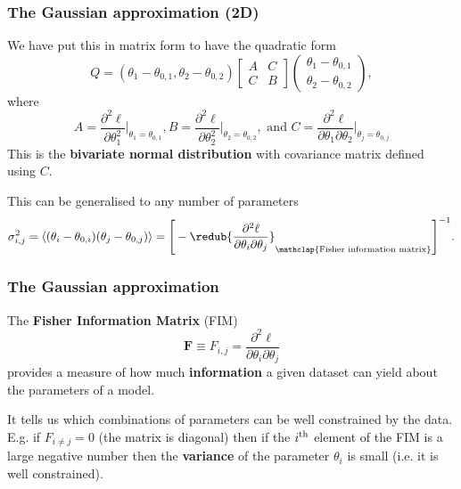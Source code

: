 \begin{frame}

\frametitle{The Gaussian approximation (2D)}
\label{thegaussianapproximation2d}

We have put this in matrix form to have the quadratic form
\[
Q = (\theta_1-\theta_{0,1}, \theta_2-\theta_{0,2})\left[ 
\begin{array}{cc}
A & C \\
C & B
\end{array}\right]\left( \begin{array}{c}
\theta_1-\theta_{0,1} \\
\theta_2-\theta_{0,2}
\end{array}\right),
\]
where
\[
A = \frac{\partial^2 \ell}{\partial \theta^2_1}\Big|_{\theta_1=\theta_{0,1}}, 
B = \frac{\partial^2 \ell}{\partial \theta^2_2}\Big|_{\theta_2=\theta_{0,2}}, \text{ and }
C = \frac{\partial^2 \ell}{\partial \theta_1 \partial \theta_2}\Big|_{\theta_j=\theta_{0,j}}
\]
This is the \textbf{bivariate normal distribution} with covariance matrix defined using $C$.

This can be generalised to any number of parameters
\[
\sigma_{i,j}^2 = \langle(\theta_i-\theta_{0,i})(\theta_j-\theta_{0,j})\rangle = \Bigg[ -\redub{\frac{\partial^2 \ell}{\partial \theta_i \partial \theta_j}}_{\mathclap{\text{Fisher information matrix}}} \Bigg]^{-1}.
\]

\end{frame}

\begin{frame}

\frametitle{The Gaussian approximation}
\label{thegaussianapproximation}

The \textbf{Fisher Information Matrix} (FIM)
\[
\mathbf{F} \equiv F_{i,j} = \frac{\partial^2 \ell}{\partial \theta_i \partial \theta_j}
\]
provides a measure of how much \textbf{information} a given dataset can yield about the parameters of a model.

It tells us which combinations of parameters can be well constrained by the data. E.g. if $F_{i\ne j} = 0$ (the
matrix is diagonal) then if the $i^{\rm th}$ element of the FIM is a large negative number then the \textbf{variance}
of the parameter $\theta_i$ is small (i.e. it is well constrained).

\end{frame}

